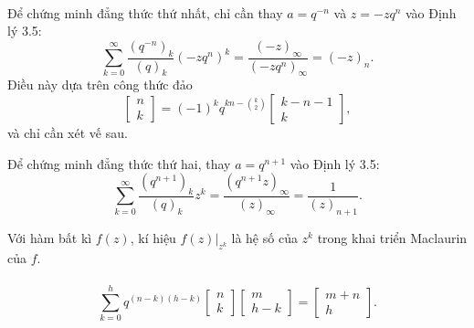 \documentclass[11pt]{article}
\begin{document}
\paragraph{}
Để chứng minh đẳng thức thứ nhất, chỉ cần thay \(a=q^{-n}\) và
\(z=-zq^n\) vào Định lý 3.5:
\[
  \sum_{k=0}^{\infty}\frac{(q^{-n})_k}{(q)_k}(-zq^n)^k
  =
  \frac{(-z)_\infty}{(-zq^n)_\infty}
  =
  (-z)_n.
\]
Điều này dựa trên công thức đảo
\[
  \left[\begin{matrix}n\\ k\end{matrix}\right]
  =
  (-1)^k q^{kn-\binom{k}{2}}
  \left[\begin{matrix}k-n-1\\ k\end{matrix}\right],
\]
và chỉ cần xét vế sau.

Để chứng minh đẳng thức thứ hai, thay \(a=q^{n+1}\) vào Định lý 3.5:
\[
  \sum_{k=0}^{\infty}\frac{(q^{n+1})_k}{(q)_k}z^k
  =
  \frac{(q^{n+1}z)_\infty}{(z)_\infty}
  =
  \frac{1}{(z)_{n+1}}.
\]


Với hàm bất kì \(f(z)\), kí hiệu \(f(z)|_{z^k}\) là hệ số của \(z^k\) trong
khai triển Maclaurin của \(f\).

\paragraph{}
\[
  \sum_{k=0}^{h}
  q^{(n-k)(h-k)}
  \left[\begin{matrix}n\\ k\end{matrix}\right]
  \left[\begin{matrix}m\\ h-k\end{matrix}\right]
  =
  \left[\begin{matrix}m+n\\ h\end{matrix}\right].
\]
\end{document}
